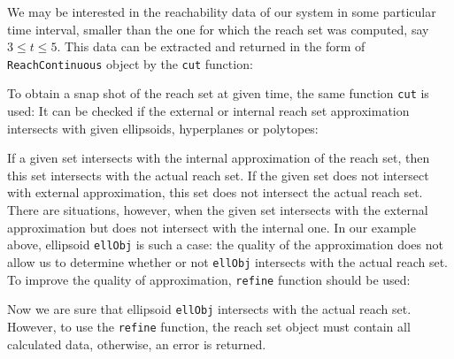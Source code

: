 We may be interested in the reachability data of our system in some
particular time interval, smaller than the one for which the reach set was
computed, say $3\leq t\leq5$.
This data can be extracted and returned in the form of {\tt ReachContinuous}
object by the {\tt cut} function:

To obtain a snap shot of the reach set at given time, the same function
{\tt cut} is used:
It can be checked if the external or internal reach set approximation
intersects with given ellipsoids, hyperplanes or polytopes:




If a given set intersects with the internal approximation of the reach set,
then this set intersects with the actual reach set.
If the given set does not
intersect with external approximation, this set does not
intersect the actual reach set. There are situations, however, when the
given set intersects with the external approximation but does not intersect
with the internal one. In our example above, ellipsoid {\tt ellObj} is such a case:
the quality of the approximation does not allow us to determine whether or not
{\tt ellObj} intersects with the actual reach set. To improve the quality
of approximation, {\tt refine} function should be used:

Now we are sure that ellipsoid {\tt ellObj} intersects with the actual reach set.
However, to use the {\tt refine} function,
the reach set object must contain all calculated data, otherwise, an
error is returned.


